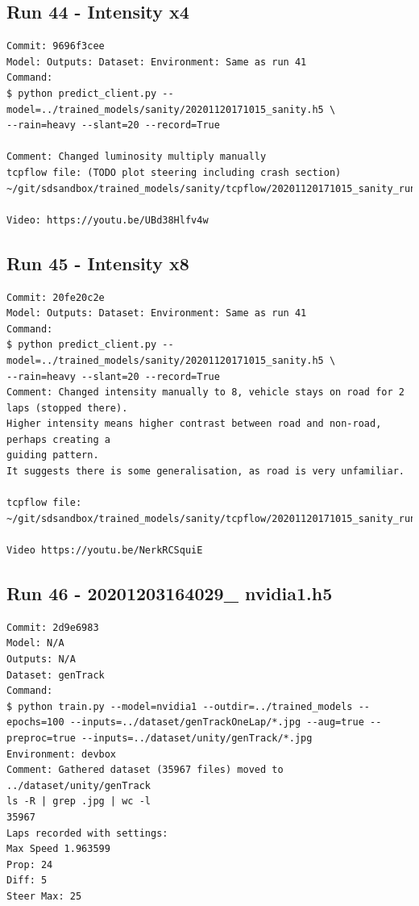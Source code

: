 \subsection{Run 44 - Intensity x4}
\begin{verbatim}
Commit: 9696f3cee
Model: Outputs: Dataset: Environment: Same as run 41 
Command: 
$ python predict_client.py --model=../trained_models/sanity/20201120171015_sanity.h5 \
--rain=heavy --slant=20 --record=True

Comment: Changed luminosity multiply manually 
tcpflow file: (TODO plot steering including crash section)
~/git/sdsandbox/trained_models/sanity/tcpflow/20201120171015_sanity_run44.log

Video: https://youtu.be/UBd38Hlfv4w

\end{verbatim}


\subsection{Run 45 - Intensity x8}
\begin{verbatim}
Commit: 20fe20c2e
Model: Outputs: Dataset: Environment: Same as run 41 
Command: 
$ python predict_client.py --model=../trained_models/sanity/20201120171015_sanity.h5 \
--rain=heavy --slant=20 --record=True
Comment: Changed intensity manually to 8, vehicle stays on road for 2 laps (stopped there).
Higher intensity means higher contrast between road and non-road, perhaps creating a 
guiding pattern.
It suggests there is some generalisation, as road is very unfamiliar.

tcpflow file:
~/git/sdsandbox/trained_models/sanity/tcpflow/20201120171015_sanity_run45.log

Video https://youtu.be/NerkRCSquiE
\end{verbatim}


\subsection{Run 46 - 20201203164029\_ nvidia1.h5}
\begin{verbatim}
Commit: 2d9e6983
Model: N/A
Outputs: N/A
Dataset: genTrack
Command: 
$ python train.py --model=nvidia1 --outdir=../trained_models --epochs=100 --inputs=../dataset/genTrackOneLap/*.jpg --aug=true --preproc=true --inputs=../dataset/unity/genTrack/*.jpg
Environment: devbox
Comment: Gathered dataset (35967 files) moved to ../dataset/unity/genTrack
ls -R | grep .jpg | wc -l
35967
Laps recorded with settings:
Max Speed 1.963599
Prop: 24
Diff: 5
Steer Max: 25
\end{verbatim}

